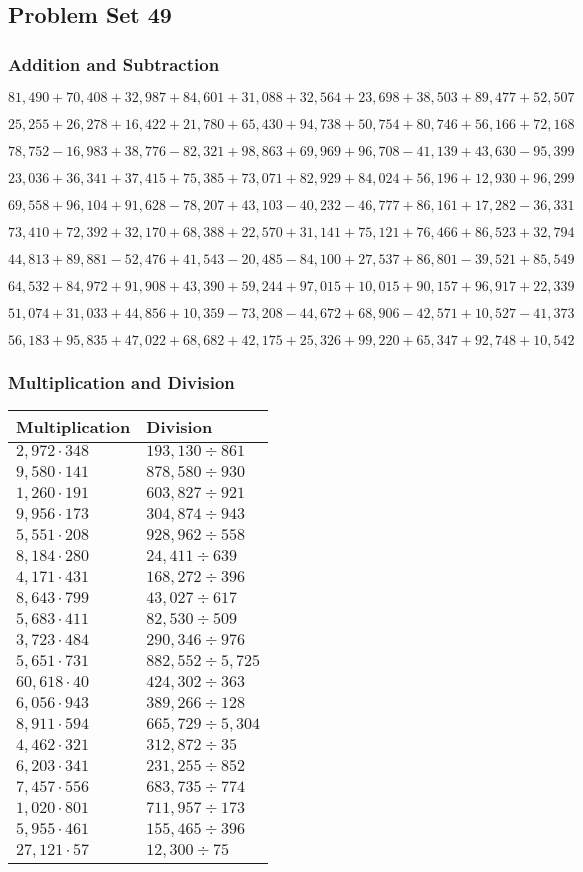 \hypertarget{problem-set-49-3}{%
\subsection{Problem Set 49}\label{problem-set-49-3}}

\hypertarget{addition-and-subtraction-271}{%
\subsubsection{Addition and
Subtraction}\label{addition-and-subtraction-271}}

\(81,490+70,408+32,987+84,601+31,088+32,564+23,698+38,503+89,477+ 52,507\)

\(25,255+26,278+16,422+21,780+65,430+94,738+50,754+80,746+56,166+72,168\)

\(78,752-16,983+38,776-82,321+98,863+69,969+96,708-41,139+43,630-95,399\)

\(23,036+36,341+37,415+75,385+73,071+82,929+84,024+56,196+12,930+96,299\)

\(69,558+96,104+91,628-78,207+43,103-40,232-46,777+86,161+17,282-36,331\)

\(73,410+72,392+32,170+68,388+22,570+31,141+75,121+76,466+86,523+32,794\)

\(44,813+89,881-52,476+41,543-20,485-84,100+27,537+86,801-39,521+85,549\)

\(64,532+84,972+91,908+43,390+59,244+97,015+10,015+90,157+96,917+22,339\)

\(51,074+31,033+44,856+10,359-73,208-44,672+68,906-42,571+10,527-41,373\)

\(56,183+95,835+47,022+68,682+42,175+25,326+99,220+65,347+92,748+10,542\)

\hypertarget{multiplication-and-division-270}{%
\subsubsection{Multiplication and
Division}\label{multiplication-and-division-270}}

\begin{longtable}[]{@{}ll@{}}
\toprule
Multiplication & Division\tabularnewline
\midrule
\endhead
\(2,972\cdot348\) & \(193,130÷861\)\tabularnewline
\(9,580\cdot141\) & \(878,580÷930\)\tabularnewline
\(1,260\cdot191\) & \(603,827÷921\)\tabularnewline
\(9,956\cdot173\) & \(304,874÷943\)\tabularnewline
\(5,551\cdot208\) & \(928,962÷558\)\tabularnewline
\(8,184\cdot280\) & \(24,411÷639\)\tabularnewline
\(4,171\cdot431\) & \(168,272÷396\)\tabularnewline
\(8,643\cdot799\) & \(43,027÷617\)\tabularnewline
\(5,683\cdot411\) & \(82,530÷509\)\tabularnewline
\(3,723\cdot484\) & \(290,346÷976\)\tabularnewline
\(5,651\cdot731\) & \(882,552÷5,725\)\tabularnewline
\(60,618\cdot40\) & \(424,302÷363\)\tabularnewline
\(6,056\cdot943\) & \(389,266÷128\)\tabularnewline
\(8,911\cdot594\) & \(665,729÷5,304\)\tabularnewline
\(4,462\cdot321\) & \(312,872÷35\)\tabularnewline
\(6,203\cdot341\) & \(231,255÷852\)\tabularnewline
\(7,457\cdot556\) & \(683,735÷774\)\tabularnewline
\(1,020\cdot801\) & \(711,957÷173\)\tabularnewline
\(5,955\cdot461\) & \(155,465÷396\)\tabularnewline
\(27,121\cdot57\) & \(12,300÷75\)\tabularnewline
\bottomrule
\end{longtable}

